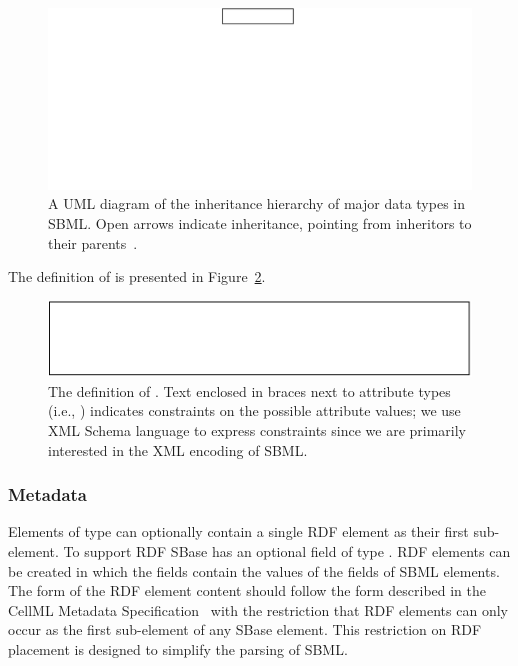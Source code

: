 \documentclass[10pt]{cekarticle}
\newcommand{\vref}[1]{\ref{#1}}
\begin{document}
\begin{figure}[h]
  \vspace*{8pt}
  \centering
  \includegraphics[scale = 0.7]{top-level}
  \caption{A UML diagram of the inheritance hierarchy of major data types
    in SBML.  Open arrows indicate inheritance, pointing from inheritors to
    their parents~\citep{eriksson:1998,oestereich:1999}.}
  \label{fig:top-level}
\end{figure}

The definition of  is presented in
Figure~\vref{fig:identified}.

\begin{figure}[b]
  \centering
  \includegraphics[scale = 0.68]{identified}
  \caption{The definition of .  Text enclosed in braces next
    to attribute types (i.e., ) indicates
    constraints on the possible attribute values; we use XML Schema
    language to express constraints since we are primarily interested in
    the XML encoding of SBML.}
  \label{fig:identified}
\end{figure}

\subsubsection{Metadata}
\label{sec:metadata}

Elements of type  can optionally contain a single RDF
 element as their first sub-element.  To support RDF
SBase has an optional field  of type .
RDF  elements can be created in which the
 fields contain the values of the
 fields of SBML elements. The form of the RDF
element content should follow the form described in the CellML
Metadata Specification~\citep{cuellar:2002} with the restriction
that RDF elements can only occur as the first sub-element of any
SBase element. This restriction on RDF placement is designed to
simplify the parsing of SBML.
\end{document}
